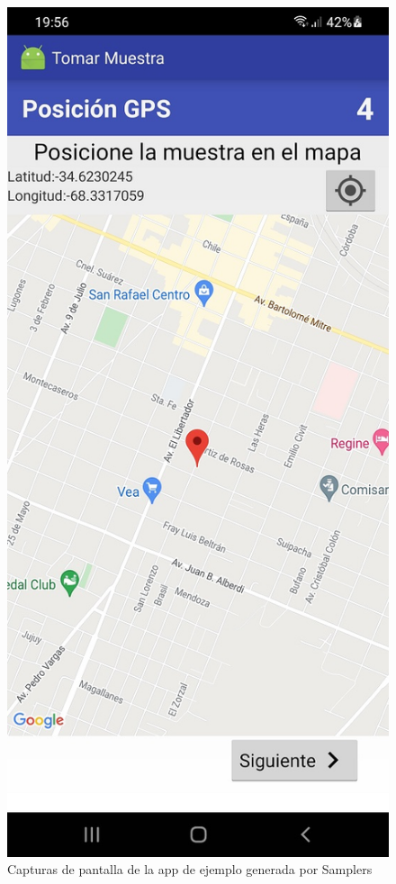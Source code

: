 \begin{figure}[H]
\begin{center}
   \includegraphics[scale=0.3]{05-implementacion/app_generada_ejemplo4.jpg}       
   \end{center}
   
   \caption{Capturas de pantalla de la app de ejemplo generada por Samplers}
\end{figure}




